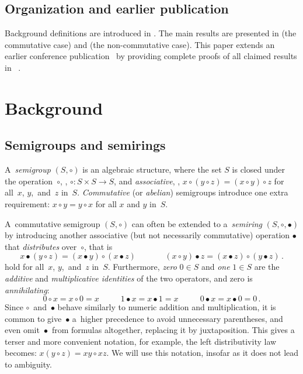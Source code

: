 \documentclass{toc}
\begin{document}
%

\subsection{Organization and earlier publication}

Background definitions are introduced in . The main
results are presented in  (the commutative case)
and  (the non-commutative case).
This paper extends an earlier conference publication~\cite{conf-version}
by providing complete proofs of all claimed results in
~.

\section{Background} \label{sec:background}

\subsection{Semigroups and semirings}
%
A~\emph{semigroup} $(S, \circ)$ is an algebraic structure, where
%
the set $S$ is closed under the operation~$\circ$,
\ie, $\circ : S\times S \rightarrow S$,
and
\emph{associative}, \ie,
$x \circ (y \circ z) = (x \circ y) \circ z$ for all~$x$, $y$,~and~$z$
in~$S$.
\emph{Commutative} (or \emph{abelian}) semigroups introduce
one extra requirement: $x \circ y = y \circ x$ for all $x$ and $y$
in~$S$.

A~commutative semigroup $(S, \circ)$ can often be extended to
a~\emph{semiring} $(S, \circ, \bullet)$ by introducing
another associative (but not necessarily commutative)
operation $\bullet$ that \emph{distributes} over~$\circ$, that is
\[
x \bullet (y \circ z) = (x \bullet y) \circ (x \bullet z)~~~~~~~~~~~~~~~~(x \circ y) \bullet z = (x \bullet z) \circ (y \bullet z)\,.
\]
hold for all~$x$, $y$,~and~$z$ in~$S$.
Furthermore, \emph{zero} $0 \in S$ and \emph{one} $1 \in S$ are the
\emph{additive} and \emph{multiplicative identities} of the two operators,
and zero is \emph{annihilating}:
\[
0 \circ x = x \circ 0=x~~~~~~~~~~~~1 \bullet x = x \bullet 1 = x~~~~~~~~~~~~0 \bullet x = x \bullet 0 = 0\,.
\]
Since $\circ$~and~$\bullet$ behave
similarly to numeric addition and multiplication, it is common to
give~$\bullet$ a~higher precedence to avoid
unnecessary parentheses, and even omit~$\bullet$~from
formulas altogether, replacing it by juxtaposition.
This gives a terser and more convenient notation, for example, the left
distributivity law becomes: $x (y \circ z) = x y \circ x z$. We will use this
notation, insofar as it does not lead to ambiguity.
\end{document}
